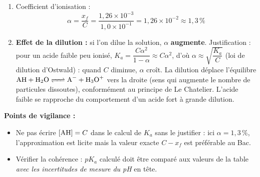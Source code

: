 \documentclass[11pt]{article}
\newcommand{\cle}[1]{{\popxbold\color{popdark}#1}}
\begin{document}
\begin{corrige}
\begin{enumerate}
\item Coefficient d'ionisation :
\[ \alpha = \frac{x_f}{C} = \frac{1{,}26\times10^{-3}}{1{,}0\times10^{-1}} = 1{,}26\times10^{-2} \approx 1{,}3\,\% \]

\item \textbf{Effet de la dilution :} si l'on dilue la solution, $\alpha$ \textbf{augmente}. Justification : pour un acide faible peu ionisé, $K_a = \dfrac{C\alpha^2}{1-\alpha} \approx C\alpha^2$, d'où $\alpha \approx \sqrt{\dfrac{K_a}{C}}$ (\cle{loi de dilution d'Ostwald}) : quand $C$ diminue, $\alpha$ croît. La dilution déplace l'équilibre $\ce{AH + H2O <=> A- + H3O+}$ vers la droite (sens qui augmente le nombre de particules dissoutes), conformément au principe de Le Chatelier. L'acide faible se rapproche du comportement d'un acide fort à grande dilution.
\end{enumerate}

\textbf{Points de vigilance :}
\begin{itemize}
\item Ne pas écrire $[\ce{AH}] = C$ dans le calcul de $K_a$ sans le justifier : ici $\alpha = 1{,}3\,\%$, l'approximation est licite mais la valeur exacte $C - x_f$ est préférable au Bac.
\item Vérifier la cohérence : $pK_a$ calculé doit être comparé aux valeurs de la table \emph{avec les incertitudes de mesure du pH} en tête.
\end{itemize}
\end{corrige}
\end{document}
